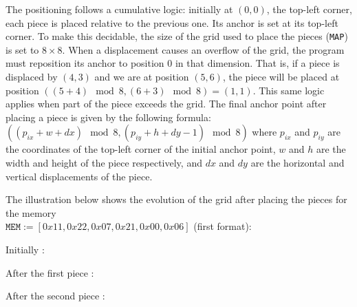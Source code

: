 \noindent 
The positioning follows a cumulative logic: initially at $(0, 0)$, the 
top-left corner, each piece is placed relative to the previous one. 
Its anchor is set at its top-left corner. To make this decidable, the 
size of the grid used to place the pieces (\texttt{MAP}) is set to 
$8 \times 8$. When a displacement causes an overflow of the grid, the 
program must reposition its anchor to position $0$ in that dimension. 
That is, if a piece is displaced by $(4, 3)$ and we are at position 
$(5, 6)$, the piece will be placed at position $((5 + 4) \mod 8, 
(6 + 3) \mod 8) = (1, 1)$. This same logic applies when part of the 
piece exceeds the grid. The final anchor point after placing a piece 
is given by the following formula: $((p_{ix} + w + dx) \mod 8, (p_{iy} 
+ h + dy - 1) \mod 8)$ where $p_{ix}$ and $p_{iy}$ are the coordinates 
of the top-left corner of the initial anchor point, $w$ and $h$ are 
the width and height of the piece respectively, and $dx$ and $dy$ are 
the horizontal and vertical displacements of the piece. 
\medskip

\noindent 
The illustration below shows the evolution of the grid after placing 
the pieces for the memory \\ $\texttt{MEM} {:=} [0x11, 0x22, 0x07, 
0x21, 0x00, 0x06]$ (first format): 
\medskip

\begin{minipage}{0.2\textwidth}
{\scriptsize Initially : }\\
\end{minipage}
\begin{minipage}{0.2\textwidth}
{\scriptsize After the first piece :} \\
\end{minipage}
\begin{minipage}{0.33\textwidth}
  {\scriptsize After the second piece :} \\
\end{minipage}
\medskip


